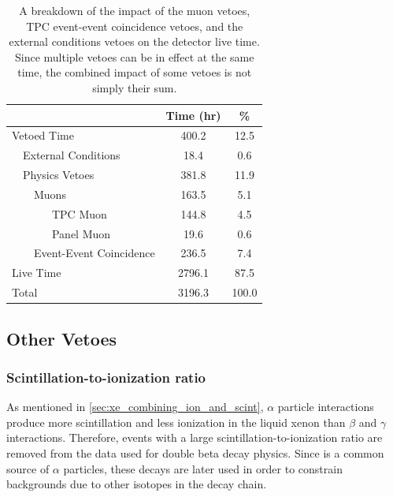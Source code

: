 \documentclass[herrin-thesis.tex]{subfiles}
\begin{document}
\begin{table}[htb]
\centering
\caption[Impact of timing-based vetoes]{A breakdown of the impact of the muon vetoes, TPC event-event coincidence vetoes, and the external conditions vetoes on the detector live time. Since multiple vetoes can be in effect at the same time, the combined impact of some vetoes is not simply their sum.}
\label{tab:analysis_veto_effects}
\begin{tabular}{l l l l c c}\toprule
\multicolumn{4}{c}{}							&	Time (\si{hr})	&	\%	\\\midrule
\multicolumn{4}{l}{Vetoed Time}				&	400.2		&	12.5	\\
	&\multicolumn{3}{l}{External Conditions}		&	18.4			&	0.6	\\
	&\multicolumn{3}{l}{Physics Vetoes}			&	381.8		&	11.9	\\
	&&\multicolumn{2}{l}{Muons}				&	163.5		&	5.1	\\
	&&&TPC Muon							&	144.8		&	4.5	\\
	&&&Panel Muon						&	19.6			&	0.6	\\
	&&\multicolumn{2}{l}{Event-Event Coincidence}&	236.5		&	7.4	\\
\multicolumn{4}{l}{Live Time}					&	2796.1		&	87.5	\\\midrule
\multicolumn{4}{l}{Total}						&	3196.3		&	100.0\\\bottomrule
\end{tabular}
\end{table}

\subsection{Other Vetoes}
\subsubsection{Scintillation-to-ionization ratio}
As mentioned in \cref{sec:xe_combining_ion_and_scint}, \(\alpha\) particle interactions produce more scintillation and less ionization in the liquid xenon than \(\beta\) and \(\gamma\) interactions. Therefore, events with a large scintillation-to-ionization ratio are removed from the data used for double beta decay physics. Since  is a common source of \(\alpha\) particles, these decays are later used in order to constrain backgrounds due to other isotopes in the  decay chain.
\end{document}
